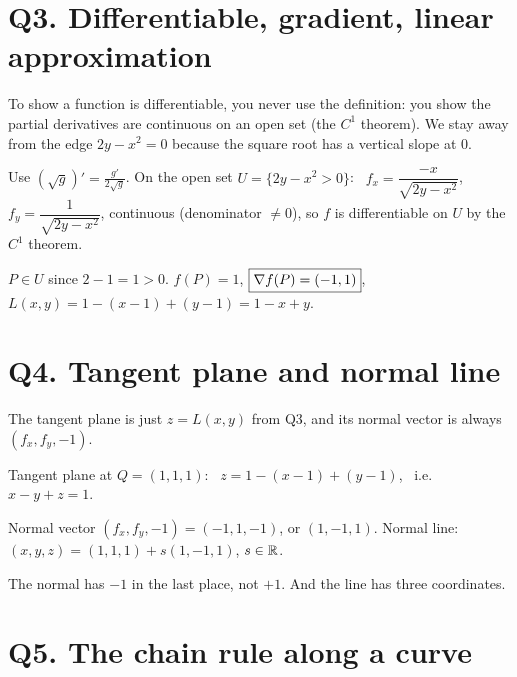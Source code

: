 \section{Q3. Differentiable, gradient, linear approximation}

\begin{idea}
To show a function is differentiable, you never use the definition: you show the partial derivatives
are continuous on an open set (the $C^1$ theorem). We stay away from the edge $2y-x^2=0$ because the
square root has a vertical slope at $0$.
\end{idea}



\begin{writethis}
 Use $(\sqrt g)'=\frac{g'}{2\sqrt g}$. On the open set $U=\{2y-x^2>0\}$: \ $f_x=\dfrac{-x}{\sqrt{2y-x^2}}$, \ $f_y=\dfrac{1}{\sqrt{2y-x^2}}$, continuous
(denominator $\ne0$), so $f$ is differentiable on $U$ by the $C^1$ theorem.

$P\in U$ since $2-1=1>0$. \quad $f(P)=1$, \quad $\boxed{\nabla f(P)=(-1,1)}$, \quad $L(x,y)=1-(x-1)+(y-1)=1-x+y$.
\end{writethis}

\section{Q4. Tangent plane and normal line}

The tangent plane is just $z=L(x,y)$ from Q3, and its normal vector is always $(f_x,f_y,-1)$.

\begin{writethis}
Tangent plane at $Q=(1,1,1)$: \ $z=1-(x-1)+(y-1)$, \ i.e. \ $\boxed{x-y+z=1}$.

Normal vector $(f_x,f_y,-1)=(-1,1,-1)$, or $(1,-1,1)$. Normal line: $(x,y,z)=(1,1,1)+s(1,-1,1)$, $s\in\mathbb{R}$.
\end{writethis}

\begin{watch}\watchout The normal has $-1$ in the last place, not $+1$. And the line has three coordinates.\end{watch}

\section{Q5. The chain rule along a curve}

